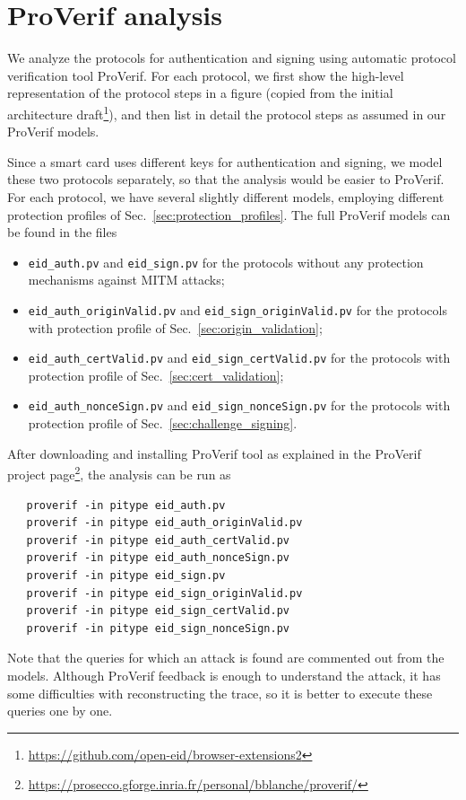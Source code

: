 \chapter{ProVerif analysis}


We analyze the protocols for authentication and signing using automatic protocol verification tool ProVerif. For each protocol, we first show the high-level representation of the protocol steps in a figure (copied from the initial architecture draft\footnote{\url{https://github.com/open-eid/browser-extensions2}}), and then list in detail the protocol steps as assumed in our ProVerif models.

Since a smart card uses different keys for authentication and signing, we model these two protocols separately, so that the analysis would be easier to ProVerif. For each protocol, we have several slightly different models, employing different protection profiles of Sec.~\ref{sec:protection_profiles}. The full ProVerif models can be found in the files
\begin{itemize}
\item\texttt{eid\_auth.pv} and \texttt{eid\_sign.pv} for the protocols without any protection mechanisms against MITM attacks;
\item\texttt{eid\_auth\_originValid.pv} and \texttt{eid\_sign\_originValid.pv} for the protocols with protection profile of Sec.~\ref{sec:origin_validation};
\item\texttt{eid\_auth\_certValid.pv} and \texttt{eid\_sign\_certValid.pv} for the protocols with protection profile of Sec.~\ref{sec:cert_validation};
\item\texttt{eid\_auth\_nonceSign.pv} and \texttt{eid\_sign\_nonceSign.pv} for the protocols with protection profile of Sec.~\ref{sec:challenge_signing}.
\end{itemize}
After downloading and installing ProVerif tool as explained in the ProVerif project page\footnote{\url{https://prosecco.gforge.inria.fr/personal/bblanche/proverif/}}, the analysis can be run as
\begin{verbatim}
   proverif -in pitype eid_auth.pv
   proverif -in pitype eid_auth_originValid.pv
   proverif -in pitype eid_auth_certValid.pv
   proverif -in pitype eid_auth_nonceSign.pv
   proverif -in pitype eid_sign.pv
   proverif -in pitype eid_sign_originValid.pv
   proverif -in pitype eid_sign_certValid.pv
   proverif -in pitype eid_sign_nonceSign.pv
\end{verbatim}

Note that the queries for which an attack is found are commented out from the models. Although ProVerif feedback is enough to understand the attack, it has some difficulties with reconstructing the trace, so it is better to execute these queries one by one.

